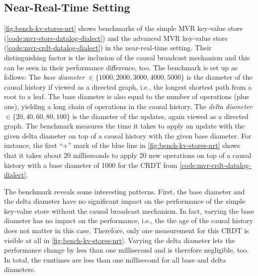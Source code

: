 

\subsection{Near-Real-Time Setting}\label{sec:bench-nrt}



\ref{fig:bench-kv-stores-nrt} shows benchmarks of the simple \ac{MVR} key-value
store (\ref{code:mvr-store-datalog-dialect}) and the advanced \ac{MVR} key-value
store (\ref{code:mvr-crdt-datalog-dialect}) in the near-real-time
setting.
Their distinguishing factor is the inclusion of the causal broadcast mechanism
and this can be seen in their performance difference, too.
The benchmark is set up as follows:
The \emph{base diameter} \(\in \{1000, 2000, 3000, 4000, 5000\}\) is the diameter
of the causal history if viewed as a directed graph,
i.e., the longest shortest path from a root to a leaf.
The base diameter is also equal to the number of operations (plus one),
yielding a long chain of operations in the causal history.
The \emph{delta diameter} \(\in \{20, 40, 60, 80, 100\}\) is the diameter of the
updates, again viewed as a directed graph.
The benchmark measures the time it takes to apply an update with the given
delta diameter on top of a causal history with the given base diameter.
For instance, the first ``+'' mark of the blue line in
\ref{fig:bench-kv-stores-nrt} shows that it takes about 20 milliseconds
to apply 20 new operations on top of a causal history with a base diameter of
1000 for the CRDT from \ref{code:mvr-crdt-datalog-dialect}.

The benchmark reveals some interesting patterns.
First, the base diameter and the delta diameter have no significant impact
on the performance of the simple key-value store without the causal broadcast
mechanism.
In fact, varying the base diameter has no impact on the performance, i.e.,
the the age of the causal history does not matter in this case.
Therefore, only one measurement for this \ac{CRDT} is visible at all
in \ref{fig:bench-kv-stores-nrt}.
Varying the delta diameter lets the performance change by less than one millisecond
and is therefore negligible, too.
In total, the runtimes are less than one millisecond for all base and delta diameters.

